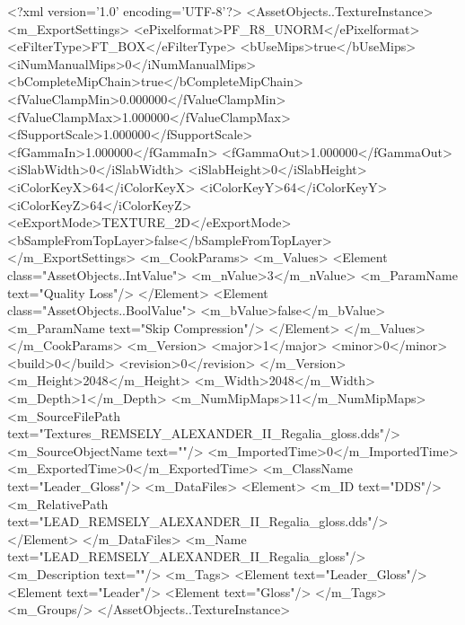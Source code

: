 <?xml version='1.0' encoding='UTF-8'?>
<AssetObjects..TextureInstance>
  <m_ExportSettings>
    <ePixelformat>PF_R8_UNORM</ePixelformat>
    <eFilterType>FT_BOX</eFilterType>
    <bUseMips>true</bUseMips>
    <iNumManualMips>0</iNumManualMips>
    <bCompleteMipChain>true</bCompleteMipChain>
    <fValueClampMin>0.000000</fValueClampMin>
    <fValueClampMax>1.000000</fValueClampMax>
    <fSupportScale>1.000000</fSupportScale>
    <fGammaIn>1.000000</fGammaIn>
    <fGammaOut>1.000000</fGammaOut>
    <iSlabWidth>0</iSlabWidth>
    <iSlabHeight>0</iSlabHeight>
    <iColorKeyX>64</iColorKeyX>
    <iColorKeyY>64</iColorKeyY>
    <iColorKeyZ>64</iColorKeyZ>
    <eExportMode>TEXTURE_2D</eExportMode>
    <bSampleFromTopLayer>false</bSampleFromTopLayer>
  </m_ExportSettings>
  <m_CookParams>
    <m_Values>
      <Element class="AssetObjects..IntValue">
        <m_nValue>3</m_nValue>
        <m_ParamName text="Quality Loss"/>
      </Element>
      <Element class="AssetObjects..BoolValue">
        <m_bValue>false</m_bValue>
        <m_ParamName text="Skip Compression"/>
      </Element>
    </m_Values>
  </m_CookParams>
  <m_Version>
    <major>1</major>
    <minor>0</minor>
    <build>0</build>
    <revision>0</revision>
  </m_Version>
  <m_Height>2048</m_Height>
  <m_Width>2048</m_Width>
  <m_Depth>1</m_Depth>
  <m_NumMipMaps>11</m_NumMipMaps>
  <m_SourceFilePath text="Textures\LEAD_REMSELY_ALEXANDER_II_Regalia_gloss.dds"/>
  <m_SourceObjectName text=""/>
  <m_ImportedTime>0</m_ImportedTime>
  <m_ExportedTime>0</m_ExportedTime>
  <m_ClassName text="Leader_Gloss"/>
  <m_DataFiles>
    <Element>
      <m_ID text="DDS"/>
      <m_RelativePath text="LEAD_REMSELY_ALEXANDER_II_Regalia_gloss.dds"/>
    </Element>
  </m_DataFiles>
  <m_Name text="LEAD_REMSELY_ALEXANDER_II_Regalia_gloss"/>
  <m_Description text=""/>
  <m_Tags>
    <Element text="Leader_Gloss"/>
    <Element text="Leader"/>
    <Element text="Gloss"/>
  </m_Tags>
  <m_Groups/>
</AssetObjects..TextureInstance>
